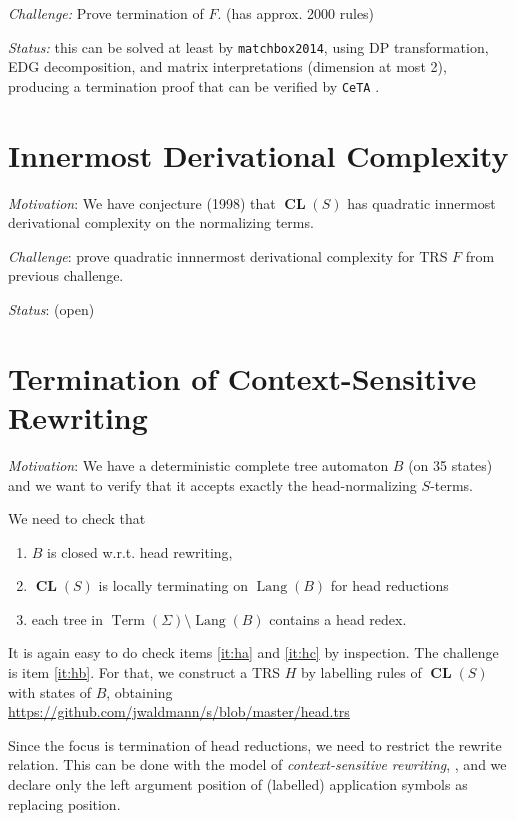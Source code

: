 \documentclass[12pt]{article}
\newcommand{\CL}{\operatorname{\textbf{CL}}}
\newcommand{\Term}{\operatorname{Term}}
\newcommand{\Lang}{\operatorname{Lang}}
\begin{document}
\emph{Challenge:} Prove termination of $F$. 
(has approx. 2000 rules)


\emph{Status:} this can be solved at least by 
\texttt{matchbox2014},
using DP transformation, EDG decomposition,
and matrix interpretations (dimension at most 2),
producing a termination proof that can be verified by 
\texttt{CeTA} \cite{DBLP:conf/tphol/ThiemannS09}.

\section{Innermost Derivational Complexity}

\emph{Motivation}: We have conjecture (1998) 
that $\CL(S)$ has quadratic innermost derivational complexity
\cite{DBLP:conf/flops/AvanziniM08}
on the normalizing terms.

\emph{Challenge}: prove quadratic
innnermost derivational complexity for TRS $F$
from previous challenge.

\emph{Status}: (open)

\section{Termination of Context-Sensitive Rewriting}

\emph{Motivation}:
We have a deterministic complete tree automaton $B$
(on 35 states)
and we want to verify that it accepts 
exactly the head-normalizing $S$-terms.

We need to check that 
\begin{enumerate}
\item \label{it:ha} 
  $B$ is closed w.r.t. head rewriting,
\item \label{it:hb} 
  $\CL(S)$ is locally terminating on $\Lang(B)$
  for head reductions
\item \label{it:hc} 
  each tree in $\Term(\Sigma)\setminus\Lang(B)$
  contains a head redex.
\end{enumerate}
It is again easy to do check 
items \ref{it:ha} and \ref{it:hc}
by inspection. The challenge is item \ref{it:hb}.
For that, we construct a TRS $H$ by labelling rules
of $\CL(S)$ with states of $B$, obtaining
\url{https://github.com/jwaldmann/s/blob/master/head.trs}

Since the focus is termination of head reductions,
we need to restrict the rewrite relation.
This can be done with the model of
\emph{context-sensitive rewriting}, 
\cite{DBLP:journals/entcs/AlarconGIL07},
and we declare
only the left argument position of (labelled)
application symbols as replacing position.
\end{document}
